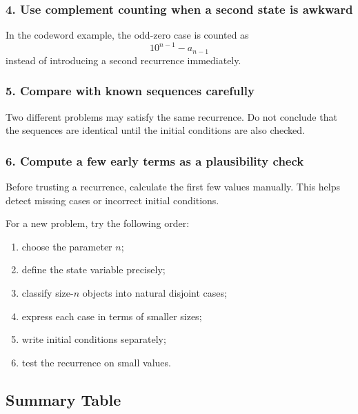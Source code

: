 \subsubsection*{4. Use complement counting when a second state is awkward}
In the codeword example, the odd-zero case is counted as
\[
10^{n-1}-a_{n-1}
\]
instead of introducing a second recurrence immediately.

\subsubsection*{5. Compare with known sequences carefully}
Two different problems may satisfy the same recurrence. Do not conclude that the sequences are identical until the initial conditions are also checked.

\subsubsection*{6. Compute a few early terms as a plausibility check}
Before trusting a recurrence, calculate the first few values manually. This helps detect missing cases or incorrect initial conditions.

\begin{extension}[title={A robust recurrence-building workflow}]
For a new problem, try the following order:
\begin{enumerate}[leftmargin=*]
    \item choose the parameter $n$;
    \item define the state variable precisely;
    \item classify size-$n$ objects into natural disjoint cases;
    \item express each case in terms of smaller sizes;
    \item write initial conditions separately;
    \item test the recurrence on small values.
\end{enumerate}
\end{extension}

\subsection{Summary Table}

